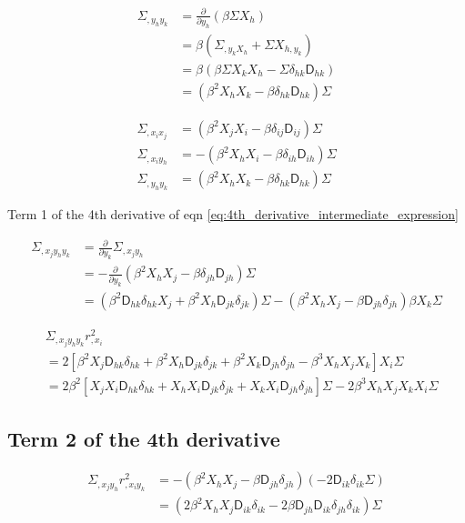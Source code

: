\begin{align*}
\Sigma_{,y_h y_k} &= \frac{\partial}{\partial y_h} (\beta \Sigma X_h)\\
&= \beta(\Sigma_{,y_k X_h} + \Sigma X_{h, y_k})\\ 
&= \beta(\beta \Sigma X_k X_h - \Sigma \delta_{hk} \mathsf{D}_{hk}) \\ 
&= (\beta^2 X_h X_k - \beta \delta_{hk} \mathsf{D}_{hk})\Sigma 
\end{align*}

\begin{align}
\Sigma_{,x_i x_j} &= (\beta^2 X_j X_i - \beta \delta_{ij} \mathsf{D}_{ij})\Sigma\\ 
\Sigma_{,x_i y_h} &= -(\beta^2 X_h X_i - \beta \delta_{ih} \mathsf{D}_{ih})\Sigma\\ 
\Sigma_{,y_h y_k} &= (\beta^2 X_h X_k - \beta \delta_{hk} \mathsf{D}_{hk})\Sigma 
\end{align}

Term 1 of the 4th derivative of eqn \ref{eq:4th_derivative_intermediate_expression}

\begin{align*}
\Sigma_{,x_j y_h y_k}
&= \frac{\partial}{\partial y_k} \Sigma_{,x_j y_h}\\ 
&= -\frac{\partial}{\partial y_k} (\beta^2 X_h X_j - \beta \delta_{jh} \mathsf{D}_{jh})\Sigma\\
&= (\beta^2 \mathsf{D}_{hk} \delta_{hk} X_j + \beta^2 X_h \mathsf{D}_{jk}\delta_{jk})\Sigma -
(\beta^2 X_h X_j - \beta \mathsf{D}_{jh} \delta_{jh})\beta X_k \Sigma
\end{align*}

\begin{align*}
&\Sigma_{,x_j y_h y_k} r_{,x_i}^2\\
&= 2[\beta^2 X_j \mathsf{D}_{hk} \delta_{hk} + \beta^2 X_h \mathsf{D}_{jk}\delta_{jk} +
\beta^2 X_k \mathsf{D}_{jh} \delta_{jh} - \beta^3 X_h X_j X_k] X_i \Sigma\\ 
&=\boxed{2\beta^2[ 
X_j X_i \mathsf{D}_{hk} \delta_{hk} + 
X_h X_i \mathsf{D}_{jk} \delta_{jk} + 
X_k X_i \mathsf{D}_{jh} \delta_{jh}] \Sigma 
- 2\beta^3 X_h X_j X_k X_i \Sigma} 
\end{align*}

\subsection{Term 2 of the 4th derivative}
\begin{align*}
\Sigma_{,x_j y_h} r^2_{,x_i y_k}
&= - (\beta^2 X_h X_j - \beta \mathsf{D}_{jh} \delta_{jh}) (-2\mathsf{D}_{ik}
\delta_{ik} \Sigma) \\  
&= \boxed{( 2 \beta^2  X_h X_j \mathsf{D}_{ik} \delta_{ik} 
-2 \beta \mathsf{D}_{jh} \mathsf{D}_{ik} \delta_{jh} \delta_{ik}) \Sigma} 
\end{align*}

